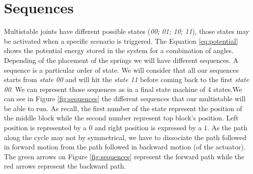     \section{Sequences}\label{sec:sequences}
        Multistable joints have different possible states (\textit{00; 01; 10; 11}), those states may be activated when a specific scenario is triggered. The Equation \ref{eq:potential} shows the potential energy stored in the system for a combination of angles. Depending of the placement of the springs we will have different sequences. A sequence is a particular order of state. We will consider that all our sequences starts from \textit{state 00} and will hit the \textit{state 11} before coming back to the first \textit{state 00}. We can represent those sequences as in a final state machine of 4 states.We can see in Figure \ref{fig:sequences} the different sequences that our multistable will be able to run. As recall, the first number of the state represent the position of the middle block while the second number represent top block's position. Left position is represented by a $0$ and right position is expressed by a $1$. As the path along the cycle may not by symmetrical, we have to dissociate the path followed in forward motion from the path followed in backward motion (of the actuator). The green arrows on Figure \ref{fig:sequences} represent the forward path while the red arrows represent the backward path. \\
        
